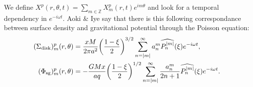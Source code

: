 \documentclass[11pt]{article}
\newcommand{\Sigmad}{\Sigma_{\rm{disk}}}
\newcommand{\Phisg}{\Phi_{\rm{sg}}}
\newcommand{\anm}{a_n^m}
\newcommand{\Pnm}{P_n^{|m|}}
\newcommand{\hPnm}{\widehat{\Pnm}}
\begin{document}
We define $X^p(r,\theta,t) = \sum_{m\in \mathbb{Z}} X_m^p(r,t) e^{i m \theta}$ and look for a temporal dependency in $e^{-i \omega t}$.
Aoki \& Iye say that there is this following correspondance between surface density and gravitational potential through the Poisson equation:
\begin{align}
(\Sigmad)_m^p (r,\theta) &= \frac{xM}{2\pi a^2} \bigg(\frac{1-\xi}{2}\bigg)^{3/2} \sum_{n=|m|}^{\infty} \anm \hPnm(\xi) e^{-i \omega t} ,\\
(\Phisg)_m^p (r,\theta) &= -\frac{GMx}{a q} \bigg(\frac{1-\xi}{2}\bigg)^{1/2} \sum_{n=|m|}^{\infty} \frac{\anm}{2n+1} \hPnm(\xi) e^{-i \omega t} .
\end{align}
\end{document}
